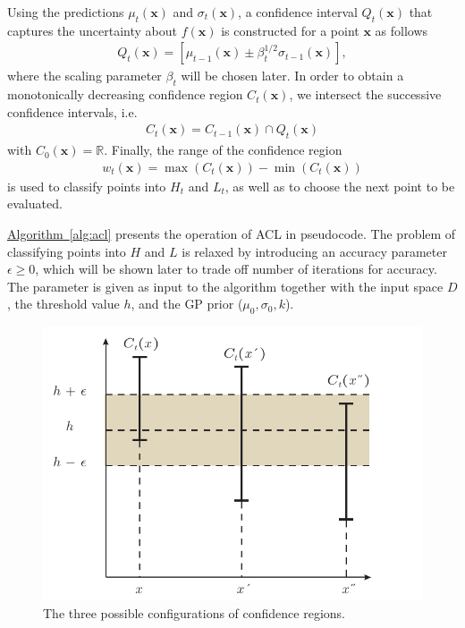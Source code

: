 \documentclass{article}
\def\*#1{\bm{#1}}
\newcommand{\algoref}[1]{\hyperref[#1]{\mbox{Algorithm~\ref*{#1}}}}
\newcommand{\acl}{\textsf{ACL}\xspace}
\begin{document}
Using the predictions $\mu_t(\*x)$ and $\sigma_t(\*x)$, a confidence
interval $Q_t(\*x)$ that captures the uncertainty about $f(\*x)$ is constructed
for a point $\*x$ as follows
\begin{align*}
Q_t(\*x) = \left[\mu_{t-1}(\*x) \pm \beta_t^{1/2}\sigma_{t-1}(\*x)\right],
\end{align*}
where the scaling parameter $\beta_t$ will be chosen later.
In order to obtain a monotonically decreasing confidence region $C_t(\*x)$,
we intersect the successive confidence intervals, i.e.
\begin{align*}
C_t(\*x) = C_{t-1}(\*x) \cap Q_t(\*x)
\end{align*}
with $C_0(\*x) = \mathbb{R}$.
Finally, the range of the confidence region
\begin{align*}
w_t(\*x) = \max(C_t(\*x)) - \min(C_t(\*x))
\end{align*}
is used to classify points into $H_t$ and $L_t$, as well as to choose
the next point to be evaluated.

\algoref{alg:acl} presents the operation of \acl in pseudocode. The problem
of classifying points into $H$ and $L$ is relaxed by introducing an
accuracy parameter $\epsilon \geq 0$, which will be shown later to trade off
number of iterations for accuracy. The parameter is given as
input to the algorithm together with the input space $D$, the threshold value
$h$, and the GP prior ($\mu_0, \sigma_0, k$).

\begin{figure}[tb]
\begin{center}
\centerline{\includegraphics[width=\columnwidth]{figures/class}}
\caption{The three possible configurations of confidence regions.}
\label{fig:class}
\end{center}
\end{figure} 
\end{document}
